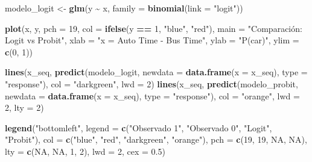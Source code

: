 \documentclass[
]{article}
\newenvironment{Shaded}{\begin{snugshade}}{\end{snugshade}}
\newcommand{\AttributeTok}[1]{\textcolor[rgb]{0.13,0.29,0.53}{#1}}
\newcommand{\ConstantTok}[1]{\textcolor[rgb]{0.56,0.35,0.01}{#1}}
\newcommand{\DecValTok}[1]{\textcolor[rgb]{0.00,0.00,0.81}{#1}}
\newcommand{\FloatTok}[1]{\textcolor[rgb]{0.00,0.00,0.81}{#1}}
\newcommand{\FunctionTok}[1]{\textcolor[rgb]{0.13,0.29,0.53}{\textbf{#1}}}
\newcommand{\NormalTok}[1]{#1}
\newcommand{\OtherTok}[1]{\textcolor[rgb]{0.56,0.35,0.01}{#1}}
\newcommand{\SpecialCharTok}[1]{\textcolor[rgb]{0.81,0.36,0.00}{\textbf{#1}}}
\newcommand{\StringTok}[1]{\textcolor[rgb]{0.31,0.60,0.02}{#1}}
\begin{document}
\begin{Shaded}
\begin{Highlighting}[]
\NormalTok{modelo\_logit  }\OtherTok{\textless{}{-}} \FunctionTok{glm}\NormalTok{(y }\SpecialCharTok{\textasciitilde{}}\NormalTok{ x, }\AttributeTok{family =} \FunctionTok{binomial}\NormalTok{(}\AttributeTok{link =} \StringTok{"logit"}\NormalTok{))}

\FunctionTok{plot}\NormalTok{(x, y, }\AttributeTok{pch =} \DecValTok{19}\NormalTok{, }\AttributeTok{col =} \FunctionTok{ifelse}\NormalTok{(y }\SpecialCharTok{==} \DecValTok{1}\NormalTok{, }\StringTok{"blue"}\NormalTok{, }\StringTok{"red"}\NormalTok{),}
     \AttributeTok{main =} \StringTok{"Comparación: Logit vs Probit"}\NormalTok{, }\AttributeTok{xlab =} \StringTok{"x = Auto Time {-} Bus Time"}\NormalTok{, }\AttributeTok{ylab =} \StringTok{"P(car)"}\NormalTok{, }\AttributeTok{ylim =} \FunctionTok{c}\NormalTok{(}\DecValTok{0}\NormalTok{, }\DecValTok{1}\NormalTok{))}

\FunctionTok{lines}\NormalTok{(x\_seq, }\FunctionTok{predict}\NormalTok{(modelo\_logit, }\AttributeTok{newdata =} \FunctionTok{data.frame}\NormalTok{(}\AttributeTok{x =}\NormalTok{ x\_seq), }\AttributeTok{type =} \StringTok{"response"}\NormalTok{),}
      \AttributeTok{col =} \StringTok{"darkgreen"}\NormalTok{, }\AttributeTok{lwd =} \DecValTok{2}\NormalTok{)}
\FunctionTok{lines}\NormalTok{(x\_seq, }\FunctionTok{predict}\NormalTok{(modelo\_probit, }\AttributeTok{newdata =} \FunctionTok{data.frame}\NormalTok{(}\AttributeTok{x =}\NormalTok{ x\_seq), }\AttributeTok{type =} \StringTok{"response"}\NormalTok{),}
      \AttributeTok{col =} \StringTok{"orange"}\NormalTok{, }\AttributeTok{lwd =} \DecValTok{2}\NormalTok{, }\AttributeTok{lty =} \DecValTok{2}\NormalTok{)}

\FunctionTok{legend}\NormalTok{(}\StringTok{"bottomleft"}\NormalTok{, }\AttributeTok{legend =} \FunctionTok{c}\NormalTok{(}\StringTok{"Observado 1"}\NormalTok{, }\StringTok{"Observado 0"}\NormalTok{, }\StringTok{"Logit"}\NormalTok{, }\StringTok{"Probit"}\NormalTok{),}
       \AttributeTok{col =} \FunctionTok{c}\NormalTok{(}\StringTok{"blue"}\NormalTok{, }\StringTok{"red"}\NormalTok{, }\StringTok{"darkgreen"}\NormalTok{, }\StringTok{"orange"}\NormalTok{),}
       \AttributeTok{pch =} \FunctionTok{c}\NormalTok{(}\DecValTok{19}\NormalTok{, }\DecValTok{19}\NormalTok{, }\ConstantTok{NA}\NormalTok{, }\ConstantTok{NA}\NormalTok{), }\AttributeTok{lty =} \FunctionTok{c}\NormalTok{(}\ConstantTok{NA}\NormalTok{, }\ConstantTok{NA}\NormalTok{, }\DecValTok{1}\NormalTok{, }\DecValTok{2}\NormalTok{), }\AttributeTok{lwd =} \DecValTok{2}\NormalTok{, }\AttributeTok{cex =} \FloatTok{0.5}\NormalTok{)}
\end{Highlighting}
\end{Shaded}
\end{document}
